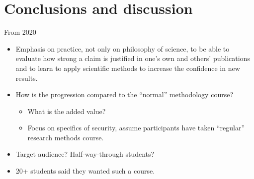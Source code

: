 \section{Conclusions and discussion}

\begin{frame}
  \begin{block}{From 2020}
    \begin{itemize}
      \item<+> Emphasis on practice, not only on philosophy of science, to be 
        able to evaluate how strong a claim is justified in one's own and 
        others' publications and to learn to apply scientific methods to 
        increase the confidence in new results.

      \item<+> How is the progression compared to the \enquote{normal} 
        methodology  course?
        \begin{itemize}
          \item What is the added value?
          \item Focus on specifics of security, assume participants have taken 
            \enquote{regular} research methods course.
        \end{itemize}

      \item<+> Target audience? Half-way-through students?

      \item<+> 20+ students said they wanted such a course.
    \end{itemize}
  \end{block}
\end{frame}

